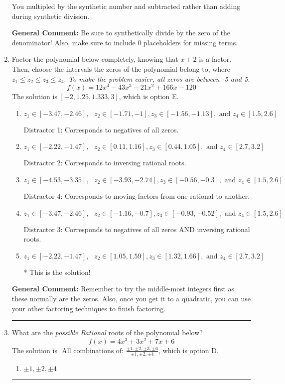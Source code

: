 \documentclass{extbook}[14pt]
\newcommand{\litem}[1]{\item #1

\rule{\textwidth}{0.4pt}}
\begin{document}
\begin{enumerate}
{\begin{enumerate}[label=\Alph*.]
 You multipled by the synthetic number and subtracted rather than adding during synthetic division.
\end{enumerate}

\textbf{General Comment:} Be sure to synthetically divide by the zero of the denominator! Also, make sure to include 0 placeholders for missing terms.
}
\litem{
Factor the polynomial below completely, knowing that $x + 2$ is a factor. Then, choose the intervals the zeros of the polynomial belong to, where $z_1 \leq z_2 \leq z_3 \leq z_4$. \textit{To make the problem easier, all zeros are between -5 and 5.}
\[ f(x) = 12x^{4} -43 x^{3} -21 x^{2} +166 x -120 \]The solution is \( [-2, 1.25, 1.333, 3] \), which is option E.\begin{enumerate}[label=\Alph*.]
\item \( z_1 \in [-3.47, -2.46], \text{   }  z_2 \in [-1.71, -1], z_3 \in [-1.56, -1.13], \text{   and   } z_4 \in [1.5, 2.6] \)

 Distractor 1: Corresponds to negatives of all zeros.
\item \( z_1 \in [-2.22, -1.47], \text{   }  z_2 \in [0.11, 1.16], z_3 \in [0.44, 1.05], \text{   and   } z_4 \in [2.7, 3.2] \)

 Distractor 2: Corresponds to inversing rational roots.
\item \( z_1 \in [-4.53, -3.35], \text{   }  z_2 \in [-3.93, -2.74], z_3 \in [-0.56, -0.3], \text{   and   } z_4 \in [1.5, 2.6] \)

 Distractor 4: Corresponds to moving factors from one rational to another.
\item \( z_1 \in [-3.47, -2.46], \text{   }  z_2 \in [-1.16, -0.7], z_3 \in [-0.93, -0.52], \text{   and   } z_4 \in [1.5, 2.6] \)

 Distractor 3: Corresponds to negatives of all zeros AND inversing rational roots.
\item \( z_1 \in [-2.22, -1.47], \text{   }  z_2 \in [1.05, 1.59], z_3 \in [1.32, 1.66], \text{   and   } z_4 \in [2.7, 3.2] \)

* This is the solution!
\end{enumerate}

\textbf{General Comment:} Remember to try the middle-most integers first as these normally are the zeros. Also, once you get it to a quadratic, you can use your other factoring techniques to finish factoring.
}
\litem{
What are the \textit{possible Rational} roots of the polynomial below?
\[ f(x) = 4x^{3} +3 x^{2} +7 x + 6 \]The solution is \( \text{ All combinations of: }\frac{\pm 1,\pm 2,\pm 3,\pm 6}{\pm 1,\pm 2,\pm 4} \), which is option D.\begin{enumerate}[label=\Alph*.]
\item \( \pm 1,\pm 2,\pm 4 \)


\end{enumerate}}
\end{enumerate}
\end{document}
